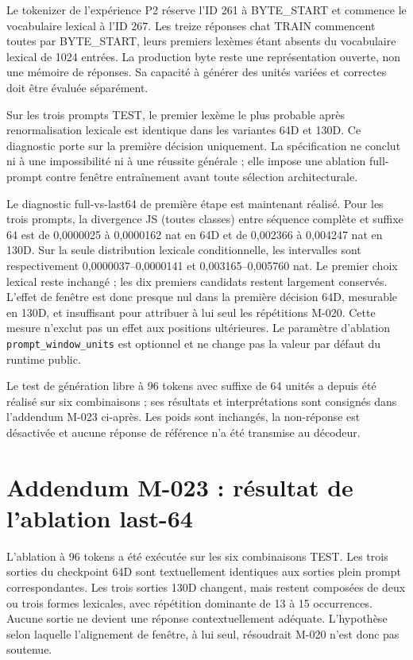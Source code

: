 \documentclass[11pt,a4paper]{report}
\begin{document}
Le tokenizer de l'expérience P2 réserve l'ID 261 à BYTE\_START et commence le vocabulaire lexical à l'ID 267. Les treize réponses chat TRAIN commencent toutes par BYTE\_START, leurs premiers lexèmes étant absents du vocabulaire lexical de 1024 entrées. La production byte reste une représentation ouverte, non une mémoire de réponses. Sa capacité à générer des unités variées et correctes doit être évaluée séparément.

Sur les trois prompts TEST, le premier lexème le plus probable après renormalisation lexicale est identique dans les variantes 64D et 130D. Ce diagnostic porte sur la première décision uniquement. La spécification ne conclut ni à une impossibilité ni à une réussite générale ; elle impose une ablation full-prompt contre fenêtre entraînement avant toute sélection architecturale.

Le diagnostic full-vs-last64 de première étape est maintenant réalisé. Pour les trois prompts, la divergence JS (toutes classes) entre séquence complète et suffixe 64 est de 0,0000025 à 0,0000162 nat en 64D et de 0,002366 à 0,004247 nat en 130D. Sur la seule distribution lexicale conditionnelle, les intervalles sont respectivement 0,0000037–0,0000141 et 0,003165–0,005760 nat. Le premier choix lexical reste inchangé ; les dix premiers candidats restent largement conservés. L'effet de fenêtre est donc presque nul dans la première décision 64D, mesurable en 130D, et insuffisant pour attribuer à lui seul les répétitions M-020. Cette mesure n'exclut pas un effet aux positions ultérieures. Le paramètre d'ablation \texttt{prompt\_window\_units} est optionnel et ne change pas la valeur par défaut du runtime public.

Le test de génération libre à 96 tokens avec suffixe de 64 unités a depuis été réalisé sur six combinaisons ; ses résultats et interprétations sont consignés dans l’addendum M-023 ci-après. Les poids sont inchangés, la non-réponse est désactivée et aucune réponse de référence n’a été transmise au décodeur.


\section*{Addendum M-023 : résultat de l'ablation last-64}
L'ablation à 96 tokens a été exécutée sur les six combinaisons TEST. Les trois sorties du checkpoint 64D sont textuellement identiques aux sorties plein prompt correspondantes. Les trois sorties 130D changent, mais restent composées de deux ou trois formes lexicales, avec répétition dominante de 13 à 15 occurrences. Aucune sortie ne devient une réponse contextuellement adéquate. L'hypothèse selon laquelle l'alignement de fenêtre, à lui seul, résoudrait M-020 n'est donc pas soutenue.
\end{document}
